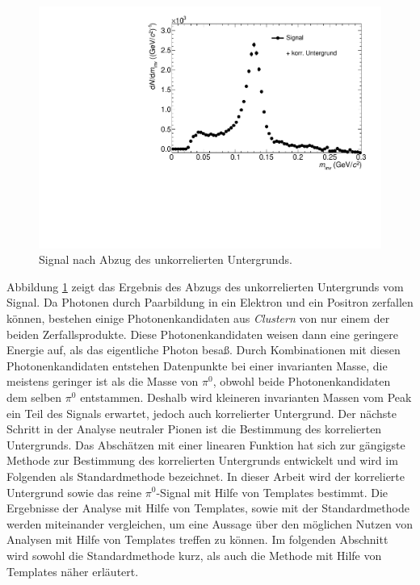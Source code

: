 \begin{figure}[tbp]
\centering
\includegraphics[width=.75\linewidth]{hInvMass_Data.pdf}
\caption{Signal nach Abzug des unkorrelierten Untergrunds.}
\label{figInvMass_Data}
\end{figure}
\newline
Abbildung \ref{figInvMass_Data} zeigt das Ergebnis des Abzugs des unkorrelierten Untergrunds vom Signal.
Da Photonen durch Paarbildung in ein Elektron und ein Positron zerfallen können, bestehen einige Photonenkandidaten aus \textit{Clustern} von nur einem der beiden Zerfallsprodukte.
Diese Photonenkandidaten weisen dann eine geringere Energie auf, als das eigentliche Photon besaß.
Durch Kombinationen mit diesen Photonenkandidaten entstehen Datenpunkte bei einer invarianten Masse, die meistens geringer ist als die Masse von $\pi^{0}$, obwohl beide Photonenkandidaten dem selben $\pi^{0}$ entstammen.
Deshalb wird kleineren invarianten Massen vom Peak ein Teil des Signals erwartet, jedoch auch korrelierter Untergrund.
\newline
Der nächste Schritt in der Analyse neutraler Pionen ist die Bestimmung des korrelierten Untergrunds.
Das Abschätzen mit einer linearen Funktion hat sich zur gängigste Methode zur Bestimmung des korrelierten Untergrunds entwickelt und wird im Folgenden als Standardmethode bezeichnet.
In dieser Arbeit wird der korrelierte Untergrund sowie das reine $\pi^{0}$-Signal mit Hilfe von Templates bestimmt.
Die Ergebnisse der Analyse mit Hilfe von Templates, sowie mit der Standardmethode werden miteinander vergleichen, um eine Aussage über den möglichen Nutzen von Analysen mit Hilfe von Templates treffen zu können.
Im folgenden Abschnitt wird sowohl die Standardmethode kurz, als auch die Methode mit Hilfe von Templates näher erläutert.